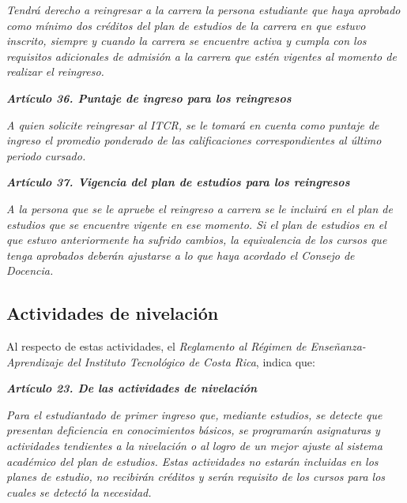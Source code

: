 \textit{Tendrá derecho a reingresar a la carrera la persona estudiante que haya aprobado como mínimo dos créditos del plan de estudios de la carrera en que estuvo inscrito, siempre y cuando la carrera se encuentre activa y cumpla con los requisitos adicionales de admisión a la carrera que estén vigentes al momento de realizar el reingreso. }\par

\textit{\textbf{Artículo 36.  Puntaje de ingreso para los reingresos}}\par

\textit{A quien solicite reingresar al ITCR, se le tomará en cuenta como puntaje de ingreso el promedio ponderado de las calificaciones correspondientes al último periodo cursado. }\par

\textit{\textbf{Artículo 37. Vigencia del plan de estudios para los reingresos }}\par

\textit{A la persona que se le apruebe el reingreso a carrera se le incluirá en el plan de estudios que se encuentre vigente en ese momento. Si el plan de estudios en el que estuvo anteriormente ha sufrido cambios, la equivalencia de los cursos que tenga aprobados deberán ajustarse a lo que haya acordado el Consejo de Docencia.}\par

\subsection*{Actividades de nivelación}

Al respecto de estas actividades, el \textit{R}\textit{eglamento al R}\textit{égimen de Enseñanza-Aprendizaje del Instituto Tecnológico de Costa Rica}, indica que:\par

\textit{\textbf{Artículo 23. De las actividades de nivelación  }}\par

\textit{Para el estudiantado de primer ingreso que, mediante estudios, se detecte que presentan deficiencia en conocimientos básicos, se programarán asignaturas y actividades tendientes a la nivelación o al logro de un mejor ajuste al sistema académico del plan de estudios. Estas actividades no estarán incluidas en los planes de estudio, no recibirán créditos y serán requisito de los cursos para los cuales se detectó la necesidad.   }\par

